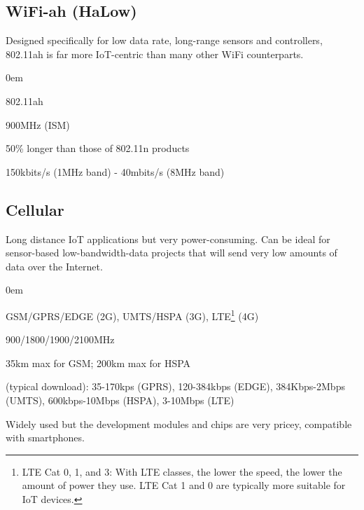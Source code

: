 \documentclass[11pt,a4paper,twoside]{article} %
\begin{document}
\clearpage


\subsection{WiFi-ah (HaLow)}
Designed specifically for low data rate, long-range sensors and controllers, 802.11ah is far more IoT-centric than many other WiFi counterparts.
\vspace{-0.5cm}
\begin{description}
	\itemsep0em
	\item [Standard] 802.11ah
	\item [Frequency] 900MHz (ISM)
	\item [Range] 50\% longer than those of 802.11n products
	\item [Bitrate] 150kbits/s (1MHz band) - 40mbits/s (8MHz band)
	\item [Power Usage]
	\item [Infrastructure]
	\item [Network topology]
\end{description}


\subsection{Cellular}
Long distance IoT applications but very power-consuming. Can be ideal for sensor-based low-bandwidth-data projects that will send very low amounts of data over the Internet.
\vspace{-0.5cm}
\begin{description}
	\itemsep0em
	\item [Standard] GSM/GPRS/EDGE (2G), UMTS/HSPA (3G), LTE\footnote{LTE Cat 0, 1, and 3: With LTE classes, the lower the speed, the lower the amount of power they use. LTE Cat 1 and 0 are typically more suitable for IoT devices.} (4G)
	\item [Frequency] 900/1800/1900/2100MHz
	\item [Range] 35km max for GSM; 200km max for HSPA
	\item [Bitrate] (typical download): 35-170kps (GPRS), 120-384kbps (EDGE), 384Kbps-2Mbps (UMTS), 600kbps-10Mbps (HSPA), 3-10Mbps (LTE) 
	\item [Power Usage]
	\item [Infrastructure] Widely used but the development modules and chips are very pricey, compatible with smartphones.
	\item [Network topology]
\end{description}
\end{document}
